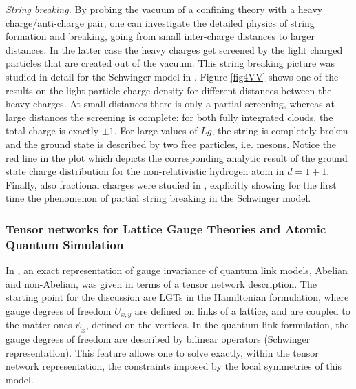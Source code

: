 \documentclass[epj,final]{svjour}
\begin{document}
\emph{String breaking.} By probing the vacuum of a confining theory with a heavy charge/anti-charge pair, one can investigate the detailed physics of string formation and breaking, going from small inter-charge distances to larger distances. In the latter case the heavy charges get screened by the light charged particles that are created out of the vacuum. This string breaking picture was studied in detail for the Schwinger model in \cite{Buyens2015}. Figure \ref{fig4VV} shows one of the results on the light particle charge density for different distances between the heavy charges. At small distances there is only a partial screening, whereas at large distances the screening is complete: for both fully integrated clouds, the total charge is exactly $\pm 1$. For large values of $Lg$, the string is completely broken and the ground state is described by two free particles, i.e. mesons. Notice the red line in the plot which depicts the corresponding analytic result of the ground state charge distribution for the non-relativistic hydrogen atom in $d=1+1$. Finally, also fractional charges were studied in \cite{Buyens2015}, explicitly showing for the first time the phenomenon of partial string breaking in the Schwinger model.           

\subsubsection{Tensor networks for Lattice Gauge Theories and Atomic Quantum Simulation\cite{rico2014tensor}}
\label{LGTN}
In \cite{rico2014tensor}, an exact representation of gauge invariance of quantum link models, Abelian and non-Abelian, was given in terms of a tensor network description. The starting point for the discussion are LGTs in the Hamiltonian formulation, where gauge degrees of freedom $U_{x,y}$ are defined on links of a lattice, and are coupled to the matter ones $\psi_{x}$, defined on the vertices. In the quantum link formulation, the gauge degrees of freedom are described by bilinear operators (Schwinger representation). This feature allows one to solve exactly, within the tensor network representation, the constraints imposed by the local symmetries of this model.
\end{document}
